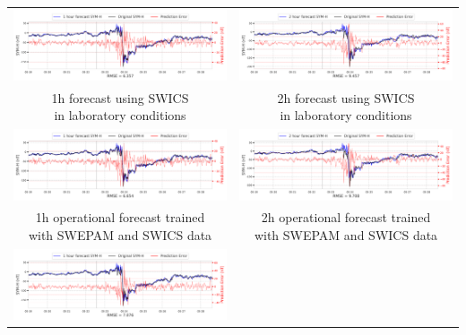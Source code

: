 \documentclass[draft,sw]{agutexSI2019}
\begin{document}
\begin{table}
\centering
\begin{tabular}{cc}
\includegraphics[width=0.49\linewidth]{paper_plots_shade/1h_swics/1h_swics_storm_32.png}
&
\includegraphics[width=0.49\linewidth]{paper_plots_shade/2h_swics/2h_swics_storm_32.png}
\\
\shortstack{1h forecast using SWICS\\ in laboratory conditions} & \shortstack{2h forecast using SWICS\\ in laboratory conditions}
\vspace*{12pt}
\\
\includegraphics[width=0.49\linewidth]{paper_plots_shade/1h_swics_rt/1h_swics_rt_storm_32.png}
&
\includegraphics[width=0.49\linewidth]{paper_plots_shade/2h_swics_rt/2h_swics_rt_storm_32.png}
\\
\shortstack{1h operational forecast trained\\ with SWEPAM and SWICS data} & \shortstack{2h operational forecast trained\\ with SWEPAM and SWICS data}
\vspace*{12pt}
\\
\includegraphics[width=0.49\linewidth]{paper_plots_shade/1h_swepam_rt/1h_swepam_rt_storm_32.png}

\end{tabular}
\end{table}
\end{document}
